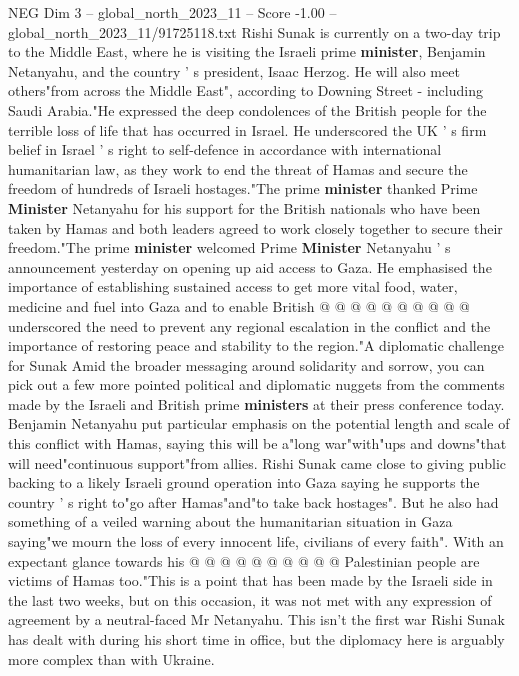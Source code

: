 \begin{textsample}{NEG Dim 3 – global\_north\_2023\_11 – Score -1.00 – global\_north\_2023\_11/91725118.txt}  \label{ex:f3_neg_281}
Rishi Sunak is currently on a two-day trip to the Middle East, where he is visiting the Israeli prime \textbf{minister}, Benjamin Netanyahu, and the country ' s president, Isaac Herzog.
He will also meet others"from across the Middle East", according to Downing Street - including Saudi Arabia."He expressed the deep condolences of the British people for the terrible loss of life that has occurred in Israel.
He underscored the UK ' s firm belief in Israel ' s right to self-defence in accordance with international humanitarian law, as they work to end the threat of Hamas and secure the freedom of hundreds of Israeli hostages."The prime \textbf{minister} thanked Prime \textbf{Minister} Netanyahu for his support for the British nationals who have been taken by Hamas and both leaders agreed to work closely together to secure their freedom."The prime \textbf{minister} welcomed Prime \textbf{Minister} Netanyahu ' s announcement yesterday on opening up aid access to Gaza.
He emphasised the importance of establishing sustained access to get more vital food, water, medicine and fuel into Gaza and to enable British @ @ @ @ @ @ @ @ @ @ underscored the need to prevent any regional escalation in the conflict and the importance of restoring peace and stability to the region."A diplomatic challenge for Sunak Amid the broader messaging around solidarity and sorrow, you can pick out a few more pointed political and diplomatic nuggets from the comments made by the Israeli and British prime \textbf{ministers} at their press conference today.
Benjamin Netanyahu put particular emphasis on the potential length and scale of this conflict with Hamas, saying this will be a"long war"with"ups and downs"that will need"continuous support"from allies.
Rishi Sunak came close to giving public backing to a likely Israeli ground operation into Gaza saying he supports the country ' s right to"go after Hamas"and"to take back hostages".
But he also had something of a veiled warning about the humanitarian situation in Gaza saying"we mourn the loss of every innocent life, civilians of every faith".
With an expectant glance towards his @ @ @ @ @ @ @ @ @ @ Palestinian people are victims of Hamas too."This is a point that has been made by the Israeli side in the last two weeks, but on this occasion, it was not met with any expression of agreement by a neutral-faced Mr Netanyahu.
This isn't the first war Rishi Sunak has dealt with during his short time in office, but the diplomacy here is arguably more complex than with Ukraine.

\end{textsample}
